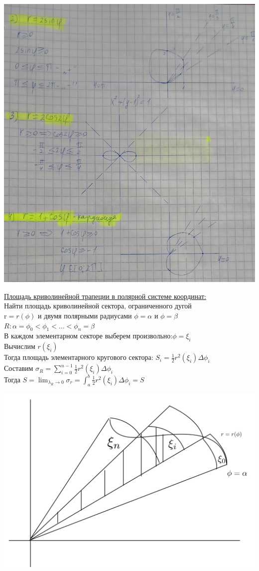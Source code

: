 \documentclass[12pt]{article}
\let\ORIincludegraphics\includegraphics
\renewcommand{\includegraphics}[2][]{\ORIincludegraphics[scale=0.65,#1]{#2}}
\begin{document}
\begin{enumerate}
\begin{center}
        \end{center}
        \begin{center}
            \includegraphics[width=0.9\linewidth]{6.9.5.png}\\
        \end{center}
        \underline{Площадь криволинейной трапеции в полярной системе координат:}\\
        Найти площадь криволинейной сектора, ограниченного дугой\\
        r$=r(\phi)$ и двумя полярными радиусами $\phi = \alpha$ и $\phi = \beta$\\
        $R: \alpha=\phi_0<\phi_1<\dots<\phi_n=\beta$\\
        В каждом элементарном секторе выберем произвольно:$\phi=\xi_i$\\
        Вычислим $r(\xi_i)$\\
        Тогда площадь элементарного кругового сектора: $S_i=\frac{1}{2} r^2(\xi_i) \Delta \phi_i$\\
        Составим $\sigma_R=\sum_{i=0}^{n-1} \frac{1}{2} r^2(\xi_i) \Delta \phi_i$\\
        Тогда $S=\lim_{\lambda_R \to 0}\sigma_r = \int_{a}^{b}\frac{1}{2} r^2(\xi_i) \Delta \phi_i=S$
        \begin{center}
            \includegraphics[width=0.7\linewidth]{6.9.6.png}

\end{center}
\end{enumerate}
\end{document}
